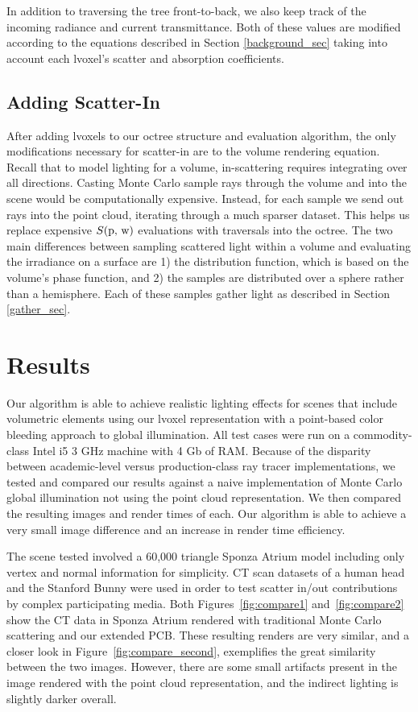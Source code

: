 \documentclass[runningheads]{llncs}
\begin{document}
In addition to traversing the tree front-to-back, we also keep track of the incoming radiance and current transmittance.  Both of these values are modified according to the equations described in Section \ref{background_sec} taking into account each lvoxel's scatter and absorption coefficients.


\subsection{Adding Scatter-In}
\label{scatterin_sec}
After adding lvoxels to our octree structure and evaluation algorithm, the only modifications necessary for scatter-in are to the volume rendering equation.  Recall that to model lighting for a volume, in-scattering requires integrating over all directions.  Casting Monte Carlo sample rays through the volume and into the scene would be computationally expensive.  Instead, for each sample we send out rays into the point cloud, iterating through a much sparser dataset.  This helps us replace expensive $S(\textup{p, w})$ evaluations with traversals into the octree.  The two main differences between sampling scattered light within a volume and evaluating the irradiance on a surface are 1) the distribution function, which is based on the volume's phase function, and 2) the samples are distributed over a sphere rather than a hemisphere.  Each of these samples gather light as described in Section \ref{gather_sec}.


\section{Results}
Our algorithm is able to achieve realistic lighting effects for scenes that include volumetric elements using our lvoxel representation with a point-based color bleeding approach to global illumination.
All test cases were run on a commodity-class Intel i5 3 GHz machine with 4 Gb of RAM.  Because of the disparity between academic-level versus production-class ray tracer implementations, we tested and compared our results against a naive implementation of Monte Carlo global illumination not using the point cloud representation.  We then compared the resulting images and render times of each.  Our algorithm is able to achieve a very small image difference and an increase in render time efficiency.

The scene tested involved a 60,000 triangle Sponza Atrium model including only vertex and normal information for simplicity.  CT scan datasets of a human head and the Stanford Bunny were used in order to test scatter in/out contributions by complex participating media.
Both Figures~\ref{fig:compare1} and~\ref{fig:compare2} show the CT data in Sponza Atrium rendered with traditional Monte Carlo scattering and our extended PCB.  These resulting renders are very similar, and a closer look in Figure~\ref{fig:compare_second}, exemplifies the great similarity between the two images.  However, there are some small artifacts present in the image rendered with the point cloud representation, and the indirect lighting is slightly darker overall. 
\end{document}
